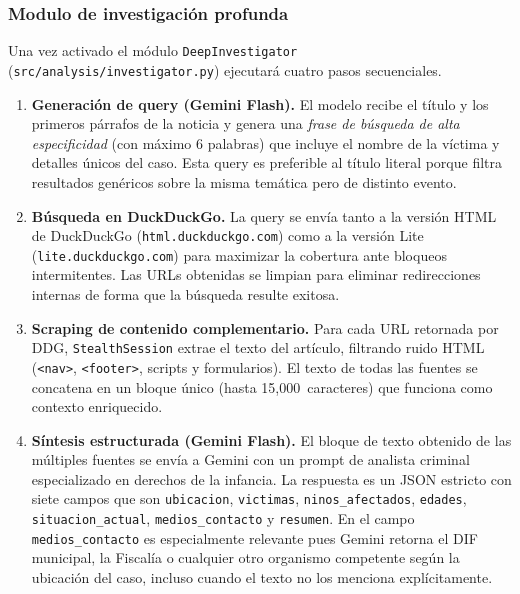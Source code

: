 \subsubsection*{Modulo de investigación profunda}

Una vez activado el módulo \texttt{DeepInvestigator} (\texttt{src/analysis/investigator.py})
ejecutará cuatro pasos secuenciales.
 
\begin{enumerate}
    \item \textbf{Generación de query (Gemini Flash).} El modelo recibe el
          título y los primeros párrafos de la noticia y genera una \textit{frase
          de búsqueda de alta especificidad} (con máximo 6 palabras) que incluye
          el nombre de la víctima y detalles únicos del caso. Esta query es
          preferible al título literal porque filtra resultados genéricos
          sobre la misma temática pero de distinto evento.

    \item \textbf{Búsqueda en DuckDuckGo.} La query se envía tanto a la
          versión HTML de DuckDuckGo (\texttt{html.duckduckgo.com}) como a
          la versión Lite (\texttt{lite.duckduckgo.com}) para maximizar la
          cobertura ante bloqueos intermitentes. Las URLs obtenidas se
          limpian para eliminar redirecciones internas de forma que la
          búsqueda resulte exitosa.

    \item \textbf{Scraping de contenido complementario.}
          Para cada URL retornada por DDG, \texttt{StealthSession} extrae
          el texto del artículo, filtrando ruido HTML (\texttt{<nav>},
          \texttt{<footer>}, scripts y formularios). El texto de todas
          las fuentes se concatena en un bloque único (hasta
          15{,}000~caracteres) que funciona como contexto enriquecido.

    \item \textbf{Síntesis estructurada (Gemini Flash).} El bloque de texto
          obtenido de las múltiples fuentes se envía a Gemini con un prompt
          de analista criminal especializado en derechos de la infancia.
          La respuesta es un JSON estricto\cite{gemini2023report} con siete campos que son
          \texttt{ubicacion}, \texttt{victimas}, \texttt{ninos\_afectados},
          \texttt{edades}, \texttt{situacion\_actual}, \texttt{medios\_contacto}
          y \texttt{resumen}. En el campo \texttt{medios\_contacto} es
          especialmente relevante pues Gemini retorna el DIF municipal,
          la Fiscalía o cualquier otro organismo competente según la ubicación
          del caso, incluso cuando el texto no los menciona explícitamente.
\end{enumerate}

